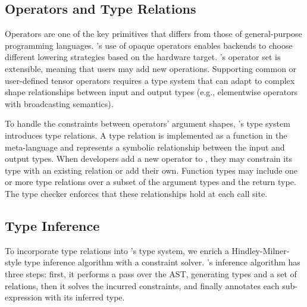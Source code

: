       \subsection*{Operators and Type Relations}
      Operators are one of the key primitives that differs from those of
        general-purpose programming languages.
      \relay's use of opaque operators enables backends to choose different
        lowering strategies based on the hardware target.
      \relay's operator set is extensible, meaning that users may add new operations.
      Supporting common or user-defined tensor operators requires a type system that can
        adapt to complex shape relationships between input and output types
        (e.g., elementwise operators with broadcasting semantics).

      To handle the constraints between operators' argument shapes, \relay's type system
        introduces type relations.
      A type relation is implemented as a function in the
        meta-language and represents a symbolic relationship between
        the input and output types.
      When developers add a new operator to \relay, they may constrain its
        type with an existing relation or add their own.
      Function types may include
        one or more type relations over a subset of the argument types and the return type.
      The type checker enforces that these relationships hold at each call site.

      \subsection*{Type Inference}
      \label{sec:inference}

      To incorporate type relations into \relay's type system, we enrich
        a Hindley-Milner-style type inference algorithm with
        a constraint solver.
      \relay's inference algorithm has three steps: first, it
        performs a pass over the AST, generating types and a set of relations,
        then it solves the incurred constraints,
        and finally annotates each sub-expression with its inferred type.


